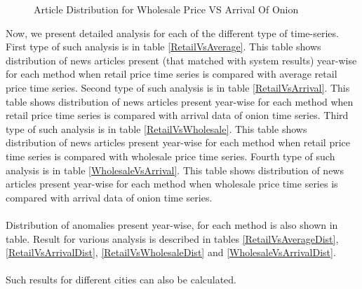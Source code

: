 \documentclass[a4paper,10pt]{report}
\begin{document}
\begin{figure}[H]
\centering
{}
\caption{Article Distribution for Wholesale Price VS Arrival Of Onion}
\label{fig:articleDistWvsA}
\end{figure}


Now, we present detailed analysis for each of the different type of time-series. First type of such analysis is in table \ref{RetailVsAverage}. This table shows distribution of news articles present (that matched with system results) year-wise for each method when retail price time series is compared with average retail price time series. Second type of such analysis is in table \ref{RetailVsArrival}. This table shows distribution of news articles present year-wise for each method when retail price time series is compared with arrival data of onion time series. Third type of such analysis is in table \ref{RetailVsWholesale}. This table shows distribution of news articles present year-wise for each method when retail price time series is compared with wholesale price time series. Fourth type of such analysis is in table \ref{WholesaleVsArrival}. This table shows distribution of news articles present year-wise for each method when wholesale price time series is compared with arrival data of onion time series.\\
\\
Distribution of anomalies present year-wise, for each method is also shown in table. Result for various analysis is described in tables  \ref{RetailVsAverageDist}, \ref{RetailVsArrivalDist}, \ref{RetailVsWholesaleDist} and \ref{WholesaleVsArrivalDist}.\\
\\
Such results for different cities can also be calculated.
\end{document}
